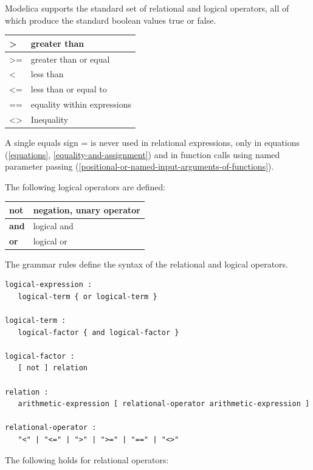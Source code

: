 \documentclass[10pt,a4paper]{report}
\begin{document}
Modelica supports the standard set of relational and logical operators,
all of which produce the standard boolean values true or false.

\begin{longtable}[]{|l|l|}
\textgreater{} & greater than\\ \hline
\textgreater{}= & greater than or equal\\ \hline
\textless{} & less than\\ \hline
\textless{}= & less than or equal to\\ \hline
== & equality within expressions\\ \hline
\textless{}\textgreater{} & Inequality\\ \hline
\end{longtable}

A single equals sign = is never used in relational expressions, only in
equations (\ref{equations}, \ref{equality-and-assignment}) and in function calls using named
parameter passing (\ref{positional-or-named-input-arguments-of-functions}).

The following logical operators are defined:

\begin{longtable}[]{|l|l|}
\textbf{not} & negation, unary operator\\ \hline
\textbf{and} & logical and\\ \hline
\textbf{or} & logical or\\ \hline
\end{longtable}

The grammar rules define the syntax of the relational and logical
operators.

\begin{lstlisting}[language=grammar]
logical-expression :
   logical-term { or logical-term }
  
logical-term :
   logical-factor { and logical-factor }
   
logical-factor :
   [ not ] relation
   
relation :
   arithmetic-expression [ relational-operator arithmetic-expression ]
   
relational-operator :
   "<" | "<=" | ">" | ">=" | "==" | "<>"
\end{lstlisting}

The following holds for relational operators:
\end{document}

